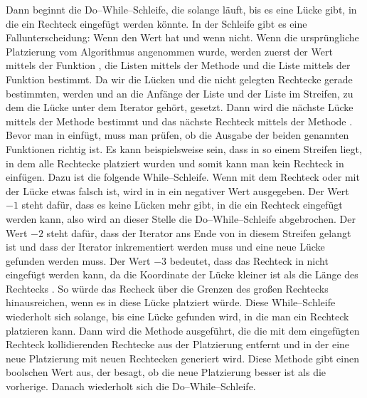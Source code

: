 Dann beginnt die Do--While--Schleife, die solange läuft, bis es eine Lücke gibt,
in die ein Rechteck eingefügt werden könnte.
In der Schleife gibt es eine Fallunterscheidung: Wenn  den Wert  hat und wenn
nicht.
Wenn die ursprüngliche Platzierung vom Algorithmus angenommen wurde,
werden zuerst der Wert  mittels der Funktion , 
die Listen  mittels der Methode  und
die Liste  mittels der Funktion  bestimmt.
Da wir die Lücken und die nicht gelegten Rechtecke gerade bestimmten, 
werden  und  an die Anfänge der Liste
 und der Liste  im Streifen, zu
dem die Lücke unter dem Iterator  gehört, gesetzt.
Dann wird die nächste Lücke  mittels der Methode  
bestimmt und das nächste Rechteck  mittels der Methode .
Bevor man  in  einfügt, muss man prüfen,
ob die Ausgabe der beiden genannten Funktionen richtig ist. 
Es kann beispielsweise sein, dass  in so einem Streifen liegt, in dem alle Rechtecke 
platziert wurden und somit kann man kein Rechteck in  einfügen.
Dazu ist die folgende While--Schleife.
Wenn mit dem Rechteck oder mit der Lücke etwas falsch ist, wird in  
in  ein negativer Wert ausgegeben. Der Wert $-1$ steht dafür, 
dass es keine Lücken mehr gibt, in die ein Rechteck eingefügt werden kann, also
wird an dieser Stelle die Do--While--Schleife abgebrochen.
Der Wert $-2$ steht dafür, dass der Iterator ans Ende von  in diesem
Streifen gelangt ist und dass der Iterator  inkrementiert werden muss und eine 
neue Lücke gefunden werden muss.
Der Wert $-3$ bedeutet, dass das Rechteck in  nicht eingefügt werden kann, 
da die Koordinate  der Lücke kleiner ist als die Länge des Rechtecks .
So würde das Recheck über die Grenzen des großen Rechtecks hinausreichen, wenn
es in diese Lücke platziert würde.
Diese While--Schleife wiederholt sich solange, bis eine Lücke gefunden wird,
in die man ein Rechteck platzieren kann. 
Dann wird die Methode  ausgeführt, die 
die mit dem eingefügten Rechteck kollidierenden Rechtecke aus der Platzierung entfernt und 
in der eine neue Platzierung mit neuen Rechtecken generiert wird. 
Diese Methode gibt einen boolschen Wert aus, der besagt, ob die neue Platzierung besser
ist als die vorherige. Danach wiederholt sich die Do--While--Schleife.


